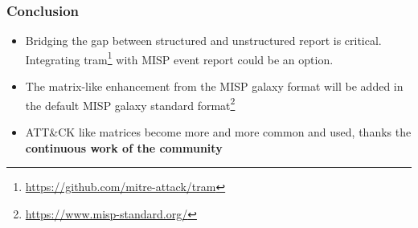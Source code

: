 \begin{frame}
        \frametitle{Conclusion}
        \begin{itemize}
                \item Bridging the gap between structured and unstructured report is critical. Integrating tram\footnote{\url{https://github.com/mitre-attack/tram}} with MISP event report could be an option.
                \item The matrix-like enhancement from the MISP galaxy format will be added in the default MISP galaxy standard format\footnote{\url{https://www.misp-standard.org/}}
                \item ATT\&CK like matrices become more and more common and used, thanks the {\bf continuous work of the community}
        \end{itemize}
\end{frame}

